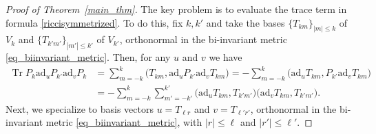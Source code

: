 \documentclass[11pt]{amsart}
\numberwithin{equation}{section}
\theoremstyle{definition}
\DeclareMathOperator{\Tr}{Tr}
\newcommand{\ad}{\mathrm{ad}}
\begin{document}
\begin{proof}[Proof of Theorem~\ref{main_thm}]
The key problem is to evaluate the trace term in formula \eqref{riccisymmetrized}. To do this, fix $k, k'$ and take the bases $\{T_{k m}\}_{|m| \leq k}$ of $V_{k}$ and $\{T_{k'm'}\}_{|m'| \leq k'}$ of $V_{k'}$, orthonormal in the bi-invariant metric \eqref{eq_biinvariant_metric}. Then, for any $u$ and $v$ we have
\begin{align}
\Tr{P_{k} \ad_{u} P_{k'}\ad_{v} P_{k}} 
&= \sum_{m=-k}^{k} \big( T_{k m}, \ad_{u} P_{k'} \ad_{v} T_{k m}\big) = -\sum_{m=-k}^{k} \big( \ad_{u} T_{k m}, P_{k'} \ad_{v} T_{k m} \big) \nonumber \\
&= -\sum_{m=-k}^{k} \sum_{m'=-k'}^{k'} \big( \ad_{u} T_{k m}, T_{k' m'}\big) \big( \ad_{v} T_{k m}, T_{k' m'}\big). \label{eq_big_trace}
\end{align}
Next, we specialize to basis vectors $u = T_{\ell r}$ and $v=T_{\ell' r'}$, orthonormal in the bi-invariant metric \eqref{eq_biinvariant_metric}, with $\lvert r\rvert \le \ell$ and $\lvert r'\rvert \le \ell'$. 


\end{proof}
\end{document}
